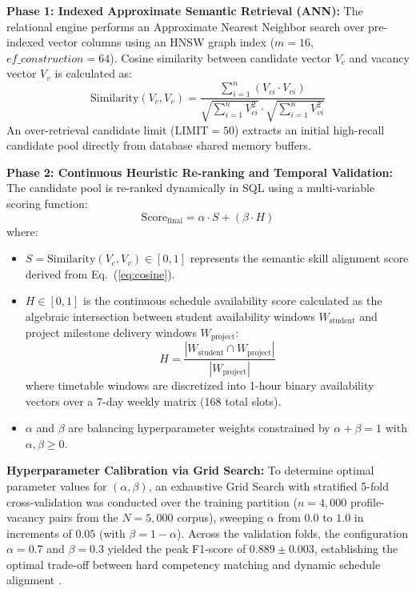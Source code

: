 \documentclass[a4paper,fleqn]{cas-dc}
\begin{document}
\medskip\noindent\textbf{Phase 1: Indexed Approximate Semantic Retrieval (ANN):}
The relational engine performs an Approximate Nearest Neighbor search over pre-indexed vector columns using an HNSW graph index ($m = 16$, $ef\_construction = 64$). Cosine similarity between candidate vector $V_c$ and vacancy vector $V_v$ is calculated as:
\begin{equation}
    \text{Similarity}(V_c, V_v) = \frac{\sum_{i=1}^n (V_{ci} \cdot V_{vi})}{\sqrt{\sum_{i=1}^n V_{ci}^2} \cdot \sqrt{\sum_{i=1}^n V_{vi}^2}}
    \label{eq:cosine}
\end{equation}
An over-retrieval candidate limit ($\text{LIMIT} = 50$) extracts an initial high-recall candidate pool directly from database shared memory buffers.

\medskip\noindent\textbf{Phase 2: Continuous Heuristic Re-ranking and Temporal Validation:}
The candidate pool is re-ranked dynamically in SQL using a multi-variable scoring function:
\begin{equation}
    \text{Score}_{\text{final}} = \alpha \cdot S + (\beta \cdot H)
    \label{eq:score}
\end{equation}
where:
\begin{itemize}
    \item $S = \text{Similarity}(V_c, V_v) \in [0, 1]$ represents the semantic skill alignment score derived from Eq.~(\ref{eq:cosine}).
    \item $H \in [0, 1]$ is the continuous schedule availability score calculated as the algebraic intersection between student availability windows $W_{\text{student}}$ and project milestone delivery windows $W_{\text{project}}$:
    \begin{equation}
        H = \frac{|W_{\text{student}} \cap W_{\text{project}}|}{|W_{\text{project}}|}
    \end{equation}
    where timetable windows are discretized into 1-hour binary availability vectors over a 7-day weekly matrix (168 total slots).
    \item $\alpha$ and $\beta$ are balancing hyperparameter weights constrained by $\alpha + \beta = 1$ with $\alpha, \beta \ge 0$.
\end{itemize}

\medskip\noindent\textbf{Hyperparameter Calibration via Grid Search:}
To determine optimal parameter values for $(\alpha, \beta)$, an exhaustive Grid Search with stratified 5-fold cross-validation was conducted over the training partition ($n = 4,000$ profile-vacancy pairs from the $N = 5,000$ corpus), sweeping $\alpha$ from $0.0$ to $1.0$ in increments of $0.05$ (with $\beta = 1 - \alpha$). Across the validation folds, the configuration $\alpha = 0.7$ and $\beta = 0.3$ yielded the peak F1-score of $0.889 \pm 0.003$, establishing the optimal trade-off between hard competency matching and dynamic schedule alignment \cite{alsaif2022, huaman2024, bisschoff2025}.
\end{document}
